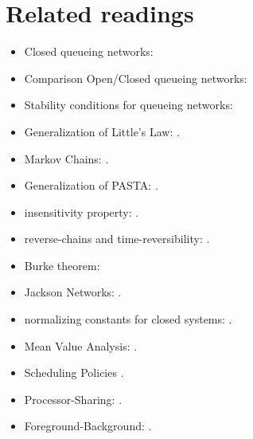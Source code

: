 \section{Related readings}
\label{sec:related-readings}

\begin{itemize}
	\item Closed queueing networks: \cite{lazowska1984quantitative,menasce2001capacity}
	
	\item Comparison Open/Closed queueing networks: \cite{bondi1986influence,schroeder2006open,tay2013analytical,whitt1984open}
	
	\item Stability conditions for queueing networks: \cite{bramson2008stability}
	
	\item Generalization of Little's Law: \cite{el2012sample,miyazawa1994rate}.
	
	\item Markov Chains: 
	\cite{ross2014introduction}.
	
	\item Generalization of PASTA: 
	\cite{wolff1982poisson}.
	
	\item insensitivity property: 
	\cite{tijms2003first}.
	
	\item reverse-chains and time-reversibility:
	\cite{bertsekas1992data,ross1996stochastic}.
	
	\item Burke theorem: 
	\cite{burke1956output}
	
	\item Jackson Networks:
	\cite{jackson1963jobshop}.
	
	\item normalizing constants for closed systems:
	\cite{harrison1985technical,choudhury1995calculating}.
	
	\item Mean Value Analysis:
	\cite{reiser1980mean,bolch2006queueing,menasce2001capacity,allen2014probability}.
	
	\item Scheduling Policies
	\cite{wierman2007scheduling}.
	
	\item Processor-Sharing:
	\cite{aalto2007beyond}.
	
	\item Foreground-Background:
	\cite{nuijens2004foreground,rai2003analysis}.
\end{itemize}
